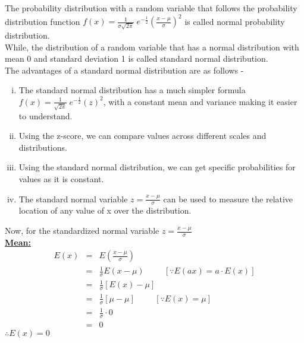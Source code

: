 \documentclass{article}
\begin{document}
\newpage
\section{}
\Large{
    The probability distribution with a random variable that follows the probability
    distribution function $f(x) = \frac{1}{\sigma\sqrt{2\pi}}\;e^{-\frac{1}{2}}\left(\frac{x-\mu}{\sigma}\right)^2$ is called normal 
    probability distribution.\\

    While, the distribution of a random variable that has a normal distribution with mean 0 
    and standard deviation 1 is called standard normal distribution.\\

    The advantages of a standard normal distribution are as follows -
    \begin{enumerate}[i)]
        \item The standard normal distribution has a much simpler formula 
            $f(x) = \frac{1}{\sqrt{2\pi}}\;e^{-\frac{1}{2}}(z)^2$, with a constant mean and variance
            making it easier to understand.

        \item Using the z-score, we can compare values across different scales and distributions.

        \item Using the standard normal distribution, we can get specific probabilities for values as it is constant.

        \item The standard normal variable $z=\frac{x-\mu}{\sigma}$ can be used to measure the relative location of any value of x over the distribution.
    \end{enumerate}

    Now, for the standardized normal variable $z=\frac{x-\mu}{\sigma}$\\

    \textbf{\underline{Mean:}}\\
    \begin{eqnarray*}
        E(x) &=& E(\frac{x-\mu}{\sigma})\\
        &=& \frac{1}{\sigma} E(x-\mu)\hspace{1cm}\left[\because E(ax) = a\cdot E(x)\right]\\
        &=& \frac{1}{\sigma}\left[E(x) - \mu\right]\\
        &=& \frac{1}{\sigma} [\mu-\mu]\hspace{1cm}\left[\because E(x) = \mu\right]\\
        &=& \frac{1}{\sigma}\cdot 0 \\
        &=& 0
    \end{eqnarray*}
    $\therefore E(x) = 0$\\

}
\end{document}
